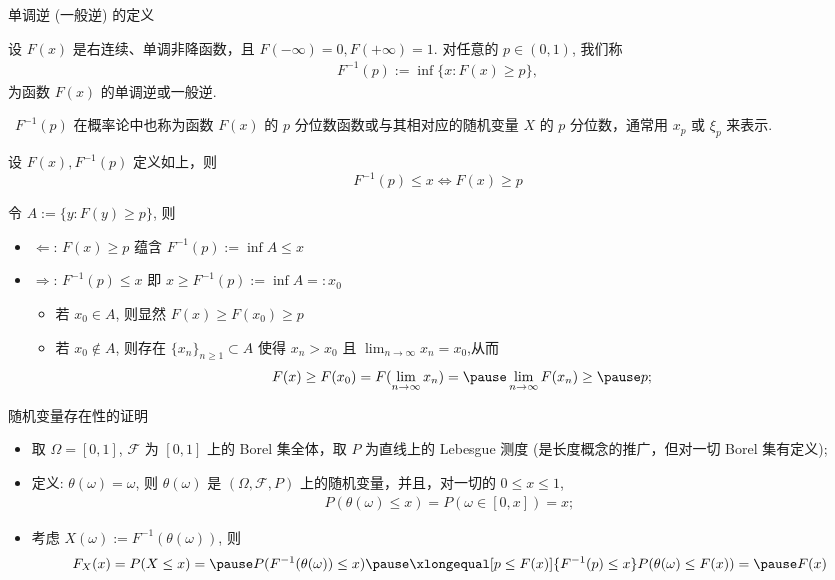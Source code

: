 \begin{frame}{单调逆 (一般逆) 的定义}
	 \vspace{-0.1cm}
	 \begin{defi}
		 设 $F (x)$ 是右连续、单调非降函数，且 $F (-\infty)=0, F (+\infty)=1$. 对任意的 $p\in (0,1)$, 我们称
		 \begin{eqnarray*}
			 F^{-1}(p):=\inf\{x: F(x)\geq p\}, %
		 \end{eqnarray*}
		 为函数 $F (x)$ 的单调逆或一般逆.
	 \end{defi}

 \pause
 \begin{rmk} \ 	 $F^{-1}(p)$ 在概率论中也称为函数 $F (x)$ 的 $p$ 分位数函数或与其相对应的随机变量 $X$ 的 $p$ 分位数，通常用 $x_p$ 或 $\xi_p$ 来表示.
 \end{rmk}
 \begin{thm}
	 设 $F (x), F^{-1}(p)$ 定义如上，则
	 \[F^{-1}(p)\leq x \Leftrightarrow F(x)\ge p \]
 \end{thm}
 \pause
 \zheng 令 $A:=\{y: F (y)\geq p\}$, 则 \pause
 \begin{itemize}[<+-|alert@+>]
	 \item $\Leftarrow$: $F (x)\geq p$ 蕴含 \pause $F^{-1}(p):=\inf A\leq x$\pause
	 \item $\Rightarrow$: $F^{-1}(p)\leq x$ 即 $x\geq F^{-1}(p):=\inf A=:x_0$\pause
	 \begin{itemize}[<+-|alert@+>]
		 \item 若 $x_0\in A$, 则显然 \pause $F (x)\geq F (x_0)\geq p$\pause
		 \item 若 $x_0\notin A$, 则存在 \pause $\{x_n\}_{n\geq 1}\subset A$ 使得 $x_n>x_0$ 且 $\lim_{n\rightarrow \infty} x_n=x_0$,\pause  从而 \pause
		 \[F(x)\geq F(x_0)=F(\lim_{n\rightarrow \infty}x_n)=\pause \lim_{n\rightarrow \infty}F(x_n)\geq\pause p;\]
	 \end{itemize}
 \end{itemize}
 \end{frame}
 \begin{frame}{随机变量存在性的证明}
 \pause
 \begin{itemize}[<+-|alert@+>]
	 \item 取 $\Omega=[0,1]$, $\mathcal{F}$ 为 $[0,1]$ 上的 Borel 集全体，取 $P$ 为直线上的 Lebesgue 测度 (是长度概念的推广，但对一切 Borel 集有定义);
	 \item 定义: $\theta (\omega)=\omega$, 则 $\theta (\omega)$ 是 $(\Omega,\mathcal{F},P)$ 上的随机变量，并且，对一切的 $0\le x\le 1$,
	 \begin{eqnarray*}
		 P(\theta(\omega)\le x)=P(\omega\in[0,x])=x;
	 \end{eqnarray*}
	 \item 考虑 $X (\omega):=F^{-1}(\theta (\omega))$, 则
	{\small\begin{eqnarray*}
			 F_X(x)=P(X\le x)=\pause P(F^{-1}(\theta(\omega))\le x)\pause \xlongequal[p\le F(x)]{F^{-1}(p)\le x} P(\theta(\omega)\le F(x))=\pause F(x)
	 \end{eqnarray*}}


 \end{itemize}


 \end{frame}

